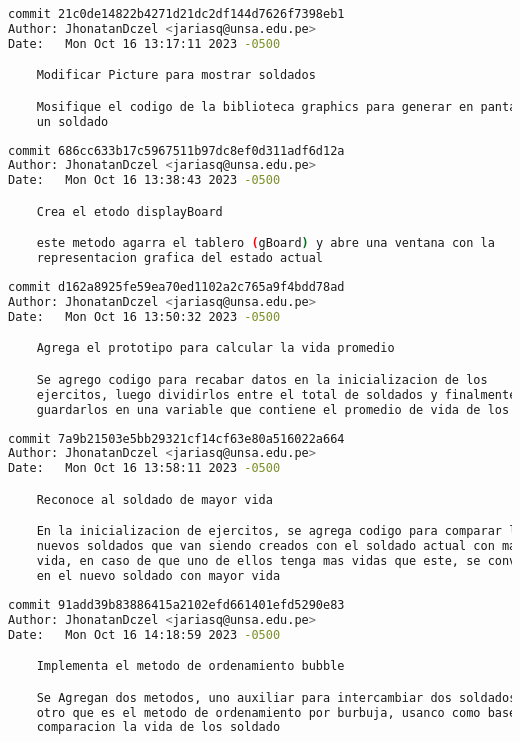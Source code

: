       \begin{lstlisting}[language=bash, caption={Commits principales}]
commit 21c0de14822b4271d21dc2df144d7626f7398eb1
Author: JhonatanDczel <jariasq@unsa.edu.pe>
Date:   Mon Oct 16 13:17:11 2023 -0500

    Modificar Picture para mostrar soldados

    Mosifique el codigo de la biblioteca graphics para generar en pantalla
    un soldado
\end{lstlisting}
      \begin{lstlisting}[language=bash, caption={Commits principales}]
commit 686cc633b17c5967511b97dc8ef0d311adf6d12a
Author: JhonatanDczel <jariasq@unsa.edu.pe>
Date:   Mon Oct 16 13:38:43 2023 -0500

    Crea el etodo displayBoard

    este metodo agarra el tablero (gBoard) y abre una ventana con la
    representacion grafica del estado actual
\end{lstlisting}
      \begin{lstlisting}[language=bash, caption={Commits principales}]
commit d162a8925fe59ea70ed1102a2c765a9f4bdd78ad
Author: JhonatanDczel <jariasq@unsa.edu.pe>
Date:   Mon Oct 16 13:50:32 2023 -0500

    Agrega el prototipo para calcular la vida promedio

    Se agrego codigo para recabar datos en la inicializacion de los
    ejercitos, luego dividirlos entre el total de soldados y finalmente
    guardarlos en una variable que contiene el promedio de vida de los ejercito
\end{lstlisting}
      \begin{lstlisting}[language=bash, caption={Commits principales}]
commit 7a9b21503e5bb29321cf14cf63e80a516022a664
Author: JhonatanDczel <jariasq@unsa.edu.pe>
Date:   Mon Oct 16 13:58:11 2023 -0500

    Reconoce al soldado de mayor vida

    En la inicializacion de ejercitos, se agrega codigo para comparar los
    nuevos soldados que van siendo creados con el soldado actual con mayor
    vida, en caso de que uno de ellos tenga mas vidas que este, se convierte
    en el nuevo soldado con mayor vida
\end{lstlisting}
      \begin{lstlisting}[language=bash, caption={Commits principales}]
commit 91add39b83886415a2102efd661401efd5290e83
Author: JhonatanDczel <jariasq@unsa.edu.pe>
Date:   Mon Oct 16 14:18:59 2023 -0500

    Implementa el metodo de ordenamiento bubble

    Se Agregan dos metodos, uno auxiliar para intercambiar dos soldados, y
    otro que es el metodo de ordenamiento por burbuja, usanco como base de
    comparacion la vida de los soldado
\end{lstlisting}

